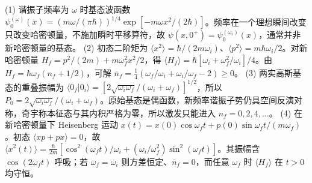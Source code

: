 (1) 谐振子频率为 \(\omega\) 时基态波函数 \(\psi_0^{(\omega)}(x)=(m\omega/(\pi\hbar))^{1/4}\exp[-m\omega x^2/(2\hbar)]\)。频率在一个理想瞬间改变只改变哈密顿量，不施加瞬时平移算符，故 \(\psi(x,0^+)=\psi_0^{(\omega_i)}(x)\)，通常并非新哈密顿量的基态。
(2) 初态二阶矩为 \(\langle x^2\rangle=\hbar/(2m\omega_i)\)、\(\langle p^2\rangle=m\hbar\omega_i/2\)。对新哈密顿量 \(H_f=p^2/(2m)+m\omega_f^2x^2/2\)，得 \(\langle H_f\rangle=\hbar[\omega_i+\omega_f^2/\omega_i]/4\)。由 \(H_f=\hbar\omega_f(n_f+1/2)\)，可解 \(\bar n_f=\frac14(\omega_f/\omega_i+\omega_i/\omega_f-2)\ge0\)。
(3) 两实高斯基态的重叠振幅为 \(\langle0_f|0_i\rangle=\left[2\sqrt{\omega_i\omega_f}/(\omega_i+\omega_f)\right]^{1/2}\)，所以 \(P_0=2\sqrt{\omega_i\omega_f}/(\omega_i+\omega_f)\)。原始基态是偶函数，新频率谐振子势仍具空间反演对称，奇宇称本征态与其内积严格为零，所以激发只能进入 \(n_f=0,2,4,\ldots\)。
(4) 在新哈密顿量下 Heisenberg 运动 \(x(t)=x(0)\cos\omega_ft+p(0)\sin\omega_ft/(m\omega_f)\)。初态 \(\langle xp+px\rangle=0\)，故 \(\langle x^2(t)\rangle=\frac{\hbar}{2m}[\cos^2(\omega_ft)/\omega_i+(\omega_i/\omega_f^2)\sin^2(\omega_ft)]\)。其振幅含 \(\cos(2\omega_ft)\) 呼吸；若 \(\omega_f=\omega_i\) 则方差恒定、\(\bar n_f=0\)，而任意 \(\omega_f\) 时 \(\langle H_f\rangle\) 在 \(t>0\) 均守恒。
